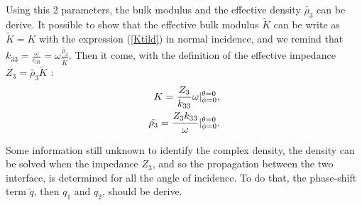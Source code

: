 \documentclass{article}
\begin{document}
    Using this 2 parameters, the bulk modulus and the effective density $\tilde{\rho_3}$ can be derive. It possible to show that the effective bulk modulus $\tilde{K}$ can be write as $\tilde{K}=K$ with the expression (\ref{Ktild}) in normal incidence, and we remind that $k_{33}=\frac{\omega}{c_{33}}=\omega\frac{\tilde{\rho_3}}{\tilde{K}}$. Then it come, with the definition of the effective impedance $Z_3=\tilde{\rho_3}\tilde{K}$ :
    \begin{align}
        K=\frac{Z_3}{k_{33}}\omega\Large{|}^{\theta=0}_{\phi=0},\\
        \tilde{\rho_3}=\frac{Z_3k_{33}}{\omega}\Large{|}^{\theta=0}_{\phi=0}.
    \end{align}
    
    Some information still unknown to identify the complex density, the density can be solved when the impedance $Z_3$, and so the propagation between the two interface, is determined for all the angle of incidence. To do that, the phase-shift term $\tilde{q}$, then $q_1$ and $q_2$, should be derive. 
    
\end{document}
